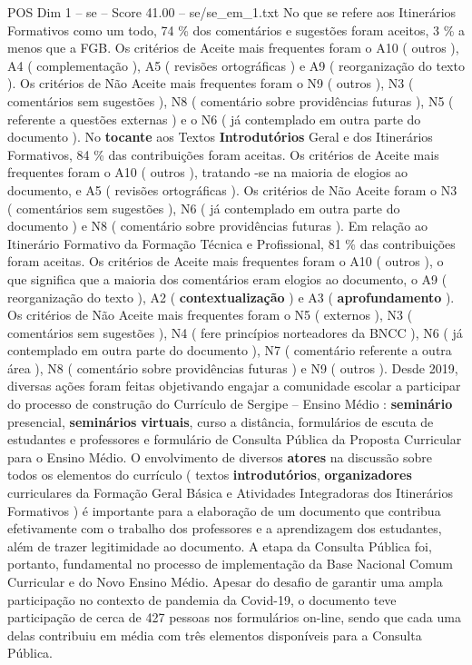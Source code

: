 \begin{textsample}{POS Dim 1 – se – Score 41.00 – se/se\_em\_1.txt}
No que se refere aos Itinerários Formativos como um todo, 74 \% dos comentários e sugestões foram aceitos, 3 \% a menos que a FGB.
Os critérios de Aceite mais frequentes foram o A10 ( outros ), A4 ( complementação ), A5 ( revisões ortográficas ) e A9 ( reorganização do texto ).
Os critérios de Não Aceite mais frequentes foram o N9 ( outros ), N3 ( comentários sem sugestões ), N8 ( comentário sobre providências futuras ), N5 ( referente a questões externas ) e o N6 ( já contemplado em outra parte do documento ).
No \textbf{tocante} aos Textos \textbf{Introdutórios} Geral e dos Itinerários Formativos, 84 \% das contribuições foram aceitas.
Os critérios de Aceite mais frequentes foram o A10 ( outros ), tratando -se na maioria de elogios ao documento, e A5 ( revisões ortográficas ).
Os critérios de Não Aceite foram o N3 ( comentários sem sugestões ), N6 ( já contemplado em outra parte do documento ) e N8 ( comentário sobre providências futuras ).
Em relação ao Itinerário Formativo da Formação Técnica e Profissional, 81 \% das contribuições foram aceitas.
Os critérios de Aceite mais frequentes foram o A10 ( outros ), o que significa que a maioria dos comentários eram elogios ao documento, o A9 ( reorganização do texto ), A2 ( \textbf{contextualização} ) e A3 ( \textbf{aprofundamento} ).
Os critérios de Não Aceite mais frequentes foram o N5 ( externos ), N3 ( comentários sem sugestões ), N4 ( fere princípios norteadores da BNCC ), N6 ( já contemplado em outra parte do documento ), N7 ( comentário referente a outra área ), N8 ( comentário sobre providências futuras ) e N9 ( outros ).
Desde 2019, diversas ações foram feitas objetivando engajar a comunidade escolar a participar do processo de construção do Currículo de Sergipe – Ensino Médio : \textbf{seminário} presencial, \textbf{seminários} \textbf{virtuais}, curso a distância, formulários de escuta de estudantes e professores e formulário de Consulta Pública da Proposta Curricular para o Ensino Médio.
O envolvimento de diversos \textbf{atores} na discussão sobre todos os elementos do currículo ( textos \textbf{introdutórios}, \textbf{organizadores} curriculares da Formação Geral Básica e Atividades Integradoras dos Itinerários Formativos ) é importante para a elaboração de um documento que contribua efetivamente com o trabalho dos professores e a aprendizagem dos estudantes, além de trazer legitimidade ao documento.
A etapa da Consulta Pública foi, portanto, fundamental no processo de implementação da Base Nacional Comum Curricular e do Novo Ensino Médio.
Apesar do desafio de garantir uma ampla participação no contexto de pandemia da Covid-19, o documento teve participação de cerca de 427 pessoas nos formulários on-line, sendo que cada uma delas contribuiu em média com três elementos disponíveis para a Consulta Pública.

\end{textsample}
